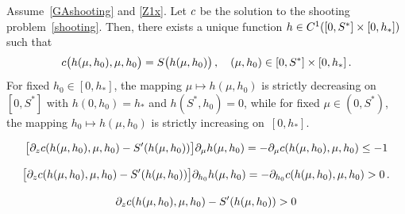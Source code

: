 \documentclass[10pt,a4paper]{amsart}
\begin{document}
\begin{lem}\label{L21}
Assume~\eqref{GAshooting} and \eqref{Z1x}.
Let ${\rm c}$  be the solution to the shooting problem~\eqref{shooting}.
Then, there exists a unique function $h\in {\rm C}^1([0,S^*]\times [0,h_*])$   such that 
\begin{align}\label{id}
{\rm c}\big(h(\mu,h_0),\mu,h_0\big)=S\big(h(\mu,h_0)\big)\,,\quad (\mu,h_0)\in [0,S^*]\times [0,h_*]\,.
\end{align}
For fixed $h_0\in [0,h_*]$, the mapping $\mu\mapsto h(\mu,h_0)$ is strictly decreasing on $[0,S^*]$ 
with $h(0,h_0)=h_*$ and $h(S^*,h_0)=0$, while for fixed $\mu\in (0,S^*)$, the mapping $h_0\mapsto h(\mu,h_0)$ is strictly increasing on~$[0,h_*]$.
\end{lem}

\begin{align}\label{381}
\big[\partial_z{\rm c}(h(\mu,h_0),\mu,h_0)-S'(h(\mu,h_0)) \big]\partial_{\mu} h(\mu,h_0)=-\partial_\mu {\rm c}(h(\mu,h_0),\mu,h_0)\le -1
\end{align}

\begin{align}\label{382}
\big[\partial_z {\rm c}(h(\mu,h_0),\mu,h_0)-S'(h(\mu,h_0)) \big]\partial_{h_0} h(\mu,h_0)=-\partial_{h_0} {\rm c}(h(\mu,h_0),\mu,h_0)>0\,.
\end{align}

\begin{equation}\label{poss}
\partial_z{\rm c}(h(\mu,h_0),\mu,h_0)-S'(h(\mu,h_0))>0
\end{equation}
\end{document}
